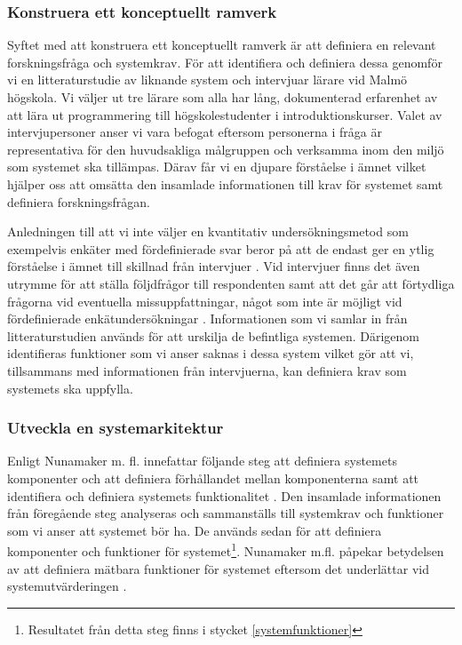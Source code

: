 \documentclass[a4paper,11pt]{article}
\begin{document}
{\subsubsection*{Konstruera ett konceptuellt ramverk}

Syftet med att konstruera ett konceptuellt ramverk är att definiera en relevant forskningsfråga och systemkrav. För att identifiera och definiera dessa genomför vi en litteraturstudie av liknande system och intervjuar lärare vid Malmö högskola. Vi väljer ut tre lärare som alla har lång, dokumenterad erfarenhet av att lära ut programmering till högskolestudenter i introduktionskurser. Valet av intervjupersoner anser vi vara befogat eftersom personerna i fråga är representativa för den huvudsakliga målgruppen och verksamma inom den miljö som systemet ska tillämpas. Därav får vi en djupare förståelse i ämnet vilket hjälper oss att omsätta den insamlade informationen till krav för systemet samt definiera forskningsfrågan. 

Anledningen till att vi inte väljer en kvantitativ undersökningsmetod som exempelvis enkäter med fördefinierade svar beror på att de endast ger en ytlig förståelse i ämnet till skillnad från intervjuer \cite{seminarieboken}. Vid intervjuer finns det även utrymme för att ställa följdfrågor till respondenten samt att det går att förtydliga frågorna vid eventuella missuppfattningar, något som inte är möjligt vid fördefinierade enkätundersökningar \cite{seminarieboken}. Informationen som vi samlar in från litteraturstudien används för att urskilja de befintliga systemen. Därigenom identifieras funktioner som vi anser saknas i dessa system vilket gör att vi, tillsammans med informationen från intervjuerna, kan definiera krav som systemets ska uppfylla.

\subsubsection*{Utveckla en systemarkitektur}

Enligt Nunamaker m. fl. innefattar följande steg att definiera systemets komponenter och att definiera förhållandet mellan komponenterna samt att identifiera och definiera systemets funktionalitet \cite{nunamaker}. Den insamlade informationen från föregående steg analyseras och sammanställs till systemkrav och funktioner som vi anser att systemet bör ha. De används sedan för att definiera komponenter och funktioner för systemet\footnote{Resultatet från detta steg finns i stycket \ref{systemfunktioner}}. Nunamaker m.fl. påpekar betydelsen av att definiera mätbara funktioner för systemet eftersom det underlättar vid systemutvärderingen \cite{nunamaker}. 

}
\end{document}
